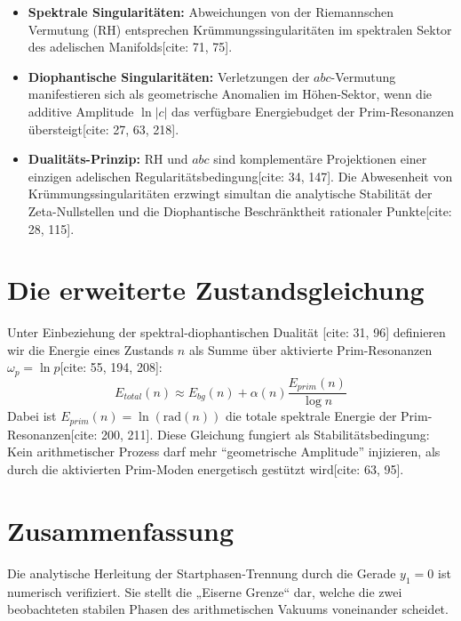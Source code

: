 \documentclass[11pt,a4paper]{article}
\begin{document}
	\begin{itemize}
		\item \textbf{Spektrale Singularitäten:} Abweichungen von der Riemannschen Vermutung (RH) entsprechen Krümmungssingularitäten im spektralen Sektor des adelischen Manifolds[cite: 71, 75].
		\item \textbf{Diophantische Singularitäten:} Verletzungen der $abc$-Vermutung manifestieren sich als geometrische Anomalien im Höhen-Sektor, wenn die additive Amplitude $\ln |c|$ das verfügbare Energiebudget der Prim-Resonanzen übersteigt[cite: 27, 63, 218].
		\item \textbf{Dualitäts-Prinzip:} RH und $abc$ sind komplementäre Projektionen einer einzigen adelischen Regularitätsbedingung[cite: 34, 147]. Die Abwesenheit von Krümmungssingularitäten erzwingt simultan die analytische Stabilität der Zeta-Nullstellen und die Diophantische Beschränktheit rationaler Punkte[cite: 28, 115].
	\end{itemize}
	
	\section{Die erweiterte Zustandsgleichung}
	Unter Einbeziehung der spektral-diophantischen Dualität [cite: 31, 96] definieren wir die Energie eines Zustands $n$ als Summe über aktivierte Prim-Resonanzen $\omega_p = \ln p$[cite: 55, 194, 208]:
	\begin{equation}
		E_{total}(n) \approx E_{bg}(n) + \alpha(n) \frac{E_{prim}(n)}{\log n}
	\end{equation}
	Dabei ist $E_{prim}(n) = \ln(\text{rad}(n))$ die totale spektrale Energie der Prim-Resonanzen[cite: 200, 211]. Diese Gleichung fungiert als Stabilitätsbedingung: Kein arithmetischer Prozess darf mehr "`geometrische Amplitude"' injizieren, als durch die aktivierten Prim-Moden energetisch gestützt wird[cite: 63, 95].
	
	\section*{Zusammenfassung}
	Die analytische Herleitung der Startphasen-Trennung durch die Gerade $y_1 = 0$ ist numerisch verifiziert. Sie stellt die „Eiserne Grenze“ dar, welche die zwei beobachteten stabilen Phasen des arithmetischen Vakuums voneinander scheidet.
	
\end{document}
